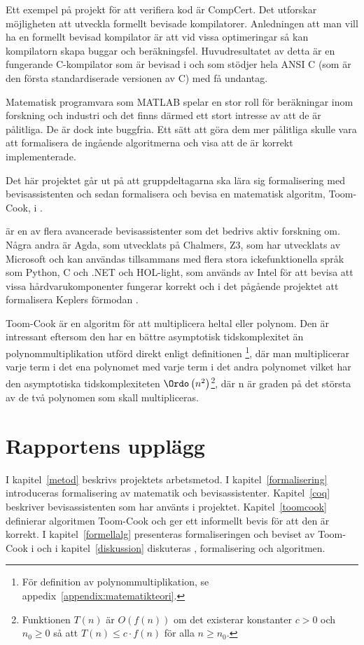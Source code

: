 Ett exempel på projekt för att verifiera kod är CompCert. Det utforskar
möjligheten att utveckla formellt bevisade kompilatorer. Anledningen att man
vill ha en formellt bevisad kompilator är att vid vissa optimeringar så kan
kompilatorn skapa buggar och beräkningsfel. Huvudresultatet av detta är en
fungerande C-kompilator som är bevisad i \coq{} och som stödjer hela ANSI C (som
är den första standardiserade versionen av C) med få
undantag\autocite{compcert}.

Matematisk programvara som MATLAB spelar en stor roll för beräkningar inom
forskning och industri och det finns därmed ett stort intresse av att de är
pålitliga. De är dock inte buggfria. Ett sätt att göra dem mer pålitliga skulle
vara att formalisera de ingående algoritmerna och visa att de är korrekt
implementerade\cite{denes2012refinement}.

Det här projektet går ut på att gruppdeltagarna ska lära sig formalisering med
bevisassistenten \coq{} och sedan formalisera och bevisa en matematisk algoritm,
Toom-Cook, i \coq{}.

\coq{} är en av flera avancerade bevisassistenter som det bedrivs aktiv forskning
om. Några andra är Agda, som utvecklats på Chalmers, Z3, som har utvecklats av
Microsoft och kan användas tillsammans med flera stora ickefunktionella språk
som Python, C och .NET och HOL-light, som används av Intel för att bevisa att
vissa hårdvarukomponenter fungerar korrekt och i det pågående projektet att
formalisera Keplers förmodan \cite{hales2008formal}.

Toom-Cook är en algoritm för att multiplicera heltal eller polynom. Den är
intressant eftersom den har en bättre asymptotisk tidskomplexitet än
polynommultiplikation utförd direkt enligt definitionen \footnote{För
definition av polynommultiplikation, se
appedix~\ref{appendix:matematikteori}.}, där man multiplicerar varje term i det
ena polynomet med varje term i det andra polynomet vilket har den asymptotiska
tidskomplexiteten $\Ordo\left(n^2\right)$\footnote{Funktionen $T(n)$ är $O(f(n))$
om det existerar konstanter $c > 0$ och $n_0 \geq 0$ så att $T(n) \leq c \cdot
f(n)$ för alla $n \geq n_0$.}, där n är graden på det största av de två
polynomen som skall multipliceras.

\section{Rapportens upplägg}
I kapitel~\ref{metod} beskrivs projektets arbetsmetod. I
kapitel~\ref{formalisering} introduceras formalisering av matematik och
bevisassistenter. Kapitel~\ref{coq} beskriver bevisassistenten \coq{} som har
använts i projektet. Kapitel~\ref{toomcook} definierar algoritmen Toom-Cook och
ger ett informellt bevis för att den är korrekt. I kapitel~\ref{formellalg}
presenteras formaliseringen och beviset av Toom-Cook i \coq{} och i
kapitel~\ref{diskussion} diskuteras \coq{}, formalisering och algoritmen.

